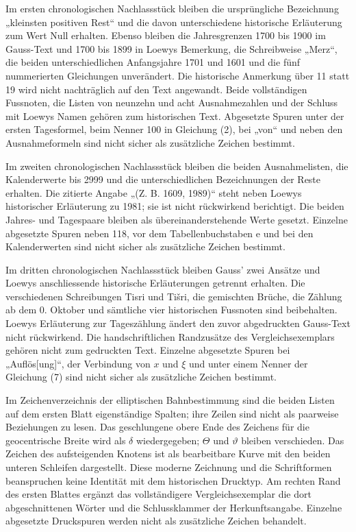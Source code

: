 Im ersten chronologischen Nachlassstück bleiben die ursprüngliche Bezeichnung „kleinsten positiven Rest“ und die davon unterschiedene historische Erläuterung zum Wert Null erhalten. Ebenso bleiben die Jahresgrenzen 1700 bis 1900 im Gauss-Text und 1700 bis 1899 in Loewys Bemerkung, die Schreibweise „Merz“, die beiden unterschiedlichen Anfangsjahre 1701 und 1601 und die fünf nummerierten Gleichungen unverändert. Die historische Anmerkung über 11 statt 19 wird nicht nachträglich auf den Text angewandt. Beide vollständigen Fussnoten, die Listen von neunzehn und acht Ausnahmezahlen und der Schluss mit Loewys Namen gehören zum historischen Text. Abgesetzte Spuren unter der ersten Tagesformel, beim Nenner 100 in Gleichung (2), bei „von“ und neben den Ausnahmeformeln sind nicht sicher als zusätzliche Zeichen bestimmt.


Im zweiten chronologischen Nachlassstück bleiben die beiden Ausnahmelisten, die Kalenderwerte bis 2999 und die unterschiedlichen Bezeichnungen der Reste erhalten. Die zitierte Angabe „(Z. B. 1609, 1989)“ steht neben Loewys historischer Erläuterung zu 1981; sie ist nicht rückwirkend berichtigt. Die beiden Jahres- und Tagespaare bleiben als übereinanderstehende Werte gesetzt. Einzelne abgesetzte Spuren neben 118, vor dem Tabellenbuchstaben e und bei den Kalenderwerten sind nicht sicher als zusätzliche Zeichen bestimmt.

Im dritten chronologischen Nachlassstück bleiben Gauss’ zwei Ansätze und Loewys anschliessende historische Erläuterungen getrennt erhalten. Die verschiedenen Schreibungen Tisri und Tišri, die gemischten Brüche, die Zählung ab dem 0. Oktober und sämtliche vier historischen Fussnoten sind beibehalten. Loewys Erläuterung zur Tageszählung ändert den zuvor abgedruckten Gauss-Text nicht rückwirkend. Die handschriftlichen Randzusätze des Vergleichsexemplars gehören nicht zum gedruckten Text. Einzelne abgesetzte Spuren bei „Auflös[ung]“, der Verbindung von $x$ und $\xi$ und unter einem Nenner der Gleichung (7) sind nicht sicher als zusätzliche Zeichen bestimmt.

Im Zeichenverzeichnis der elliptischen Bahnbestimmung sind die beiden Listen auf dem ersten Blatt eigenständige Spalten; ihre Zeilen sind nicht als paarweise Beziehungen zu lesen. Das geschlungene obere Ende des Zeichens für die geocentrische Breite wird als $\delta$ wiedergegeben; $\Theta$ und $\vartheta$ bleiben verschieden. Das Zeichen des aufsteigenden Knotens ist als bearbeitbare Kurve mit den beiden unteren Schleifen dargestellt. Diese moderne Zeichnung und die Schriftformen beanspruchen keine Identität mit dem historischen Drucktyp. Am rechten Rand des ersten Blattes ergänzt das vollständigere Vergleichsexemplar die dort abgeschnittenen Wörter und die Schlussklammer der Herkunftsangabe. Einzelne abgesetzte Druckspuren werden nicht als zusätzliche Zeichen behandelt.

